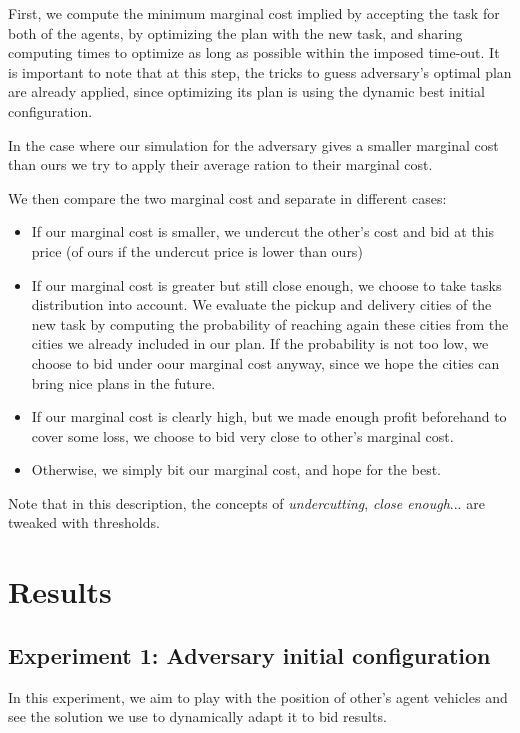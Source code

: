 \documentclass[11pt]{article}
\begin{document}
First, we compute the minimum marginal cost implied by accepting the task for both of the agents, by optimizing the plan with the new task, and sharing computing times to optimize as long as possible within the imposed time-out. It is important to note that at this step, the tricks to guess adversary's optimal plan are already applied, since optimizing its plan is using the dynamic best initial configuration.

In the case where our simulation for the adversary gives a smaller marginal cost than ours we try to apply their average ration to their marginal cost.

We then compare the two marginal cost and separate in different cases:
\begin{itemize}
	\item If our marginal cost is smaller, we undercut the other's cost and bid at this price (of ours if the undercut price is lower than ours)
	\item If our marginal cost is greater but still close enough, we choose to take tasks distribution into account. We evaluate the pickup and delivery cities of the new task by computing the probability of reaching again these cities from the cities we already included in our plan. If the probability is not too low, we choose to bid under oour marginal cost anyway, since we hope the cities can bring nice plans in the future.
	\item If our marginal cost is clearly high, but we made enough profit beforehand to cover some loss, we choose to bid very close to other's marginal cost.
	\item Otherwise, we simply bit our marginal cost, and hope for the best.
\end{itemize}

Note that in this description, the concepts of \textit{undercutting}, \textit{close enough}... are tweaked with thresholds.


\section{Results}

\subsection{Experiment 1: Adversary initial configuration}
In this experiment, we aim to play with the position of other's agent vehicles and see the solution we use to dynamically adapt it to bid results.
\end{document}
